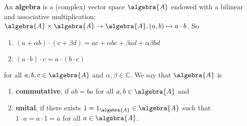 \documentclass[a4paper]{article}
\begin{document}
\begin{definition}
	An \textbf{algebra} is a (complex) vector space $\algebra{A}$ endowed with a bilinear and associative multiplication: $\algebra{A} \times \algebra{A} \to \algebra{A}, (a,b) \mapsto a \cdot b$. So
	\begin{enumerate}
		\item $(a + \alpha b) \cdot (c + \beta d) = ac + \alpha bc + \beta ad + \alpha \beta b d$
		\item  $(a \cdot b) \cdot c = a \cdot (b \cdot c)$
	\end{enumerate}
	for all $a,b,c \in \algebra{A}$ and $\alpha, \beta \in \mathds{C}$. We say that $\algebra{A}$ is
	\begin{enumerate}
		\item \textbf{commutative}, if $ab = ba$ for all $a,b \in \algebra{A}$ and
		\item \textbf{unital}, if there exists $1 = 1_\algebra{A} \in \algebra{A}$ such that $1 \cdot a = a \cdot 1 = a$ for all $a \in \algebra{A}$.
	\end{enumerate}
	~
\end{definition}
\end{document}
